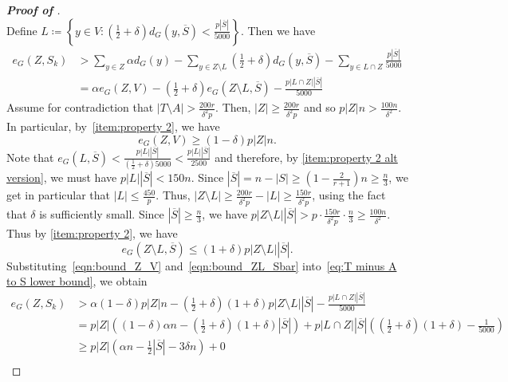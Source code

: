 \documentclass[10pt,a4paper,reqno]{amsart}
\begin{document}
\begin{proof}[\textbf{Proof of }]
\[\]
Define $L \coloneqq \left\{y \in V: \left(\tfrac{1}{2}+\delta\right)d_G(y,\overline{S})< \frac{p|\overline{S}|}{5000}\right\}$.
Then we have 
\begin{align}
    e_G(Z,S_k) &> \sum_{y \in Z}\alpha d_G(y) - \sum_{y \in Z \setminus L} \left(\tfrac{1}{2}+\delta\right)d_G(y,\overline{S}) - \sum_{y \in L\cap Z}\frac{p|\overline{S}|}{5000} \nonumber\\
    &= \alpha e_G(Z,V)  - \left(\tfrac{1}{2}+\delta\right)e_G(Z\setminus L,\overline{S}) - \frac{p|L\cap Z||\overline{S}|}{5000} \label{eq:T minus A to S lower bound}
\end{align}
Assume for contradiction that $|T\setminus A| > \frac{200r}{\delta^2 p}$.  Then, $|Z|\ge \frac{200r}{\delta^2 p}$ and so $p|Z|n >  \frac{100n}{\delta^2}$. In particular, by~\ref{item:property 2}, we have
\begin{equation}\label{eqn:bound_Z_V}
    e_G(Z,V) \ge (1-\delta)p|Z|n.
\end{equation}
Note that $e_G(L,\overline{S}) < \frac{p|L||\overline{S}|}{\left(\tfrac{1}{2}+\delta\right)5000} < \frac{p|L||\overline{S}|}{2500}$ and therefore, by \ref{item:property 2 alt version}, we must have $p|L||\overline{S}| <  150n$. Since $|\overline{S}| = n-|S| \ge \left(1-\frac{2}{r+1}\right)n \ge \frac{n}{3}$, we get in particular that $|L| \le \frac{450}{p}$. 
Thus, $|Z \setminus L| \ge \frac{200r}{\delta^2 p} - |L| \ge \frac{150r}{\delta^2 p}$, using the fact that $\delta$ is sufficiently small. Since $|\overline{S}| \ge \frac{n}{3}$, we have $p|Z\setminus L||\overline{S}| > p\cdot \frac{150r}{\delta^2 p} \cdot \frac{n}{3} \ge \frac{100n}{\delta^2}$. Thus by \ref{item:property 2}, we have
\begin{equation}\label{eqn:bound_ZL_Sbar}
e_G(Z\setminus L,\overline{S}) \le (1+\delta)p|Z\setminus L||\overline{S}|.
\end{equation}
Substituting~\eqref{eqn:bound_Z_V} and~\eqref{eqn:bound_ZL_Sbar} into~\eqref{eq:T minus A to S lower bound}, we obtain
\begin{align}
    e_G(Z,S_k) &> \alpha(1-\delta)p|Z|n  - \left(\tfrac{1}{2}+\delta\right)(1+\delta)p|Z\setminus L||\overline{S}| - \frac{p|L\cap Z||\overline{S}|}{5000}\nonumber \\
    &= p|Z|\left((1-\delta)\alpha n - \left(\tfrac{1}{2}+\delta\right)(1+\delta)|\overline{S}| \right) + p|L\cap Z||\overline{S}|\left(\left(\tfrac{1}{2}+\delta\right)(1+\delta) - \tfrac{1}{5000}\right) \nonumber \\
    &\ge p|Z|\left(\alpha n - \tfrac{1}{2}|\overline{S}| -3\delta n\right) + 0 \nonumber \\

\end{align}
\end{proof}
\end{document}
